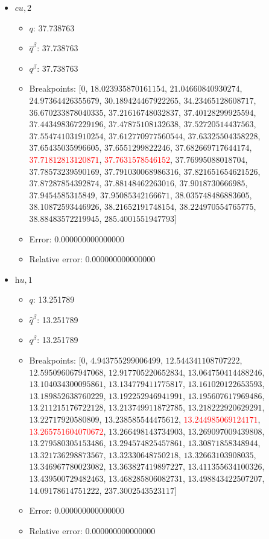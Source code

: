 \documentclass{article}%
\begin{document}
\begin{itemize}
\begin{itemize}
		\item Error: 0.000000000000000%
		\item Relative error: 0.000000000000000%
	\end{itemize}%
	\item $\textit{cu},2$%
	\begin{itemize}%
		\item $q$: 37.738763%
		\item $\hat{q}^\beta$: 37.738763%
		\item $q^\beta$: 37.738763%
		\item Breakpoints: $[$$0$, $18.023935870161154$, $21.04660840930274$, $24.97364426355679$, $30.189424467922265$, $34.23465128608717$, $36.670233878040335$, $37.21616748032837$, $37.40128299925594$, $37.443498367229196$, $37.47875108132638$, $37.52720514437563$, $37.554741031910254$, $37.612770977560544$, $37.63325504358228$, $37.65435035996605$, $37.6551299822246$, $37.682669717644174$, \textcolor{red}{$37.71812813120871$}, \textcolor{red}{$37.7631578546152$}, $37.76995088018704$, $37.78573239590169$, $37.791030068986316$, $37.821651654621526$, $37.87287854392874$, $37.88148462263016$, $37.9018730666985$, $37.9454585315849$, $37.95085342166671$, $38.035748486883605$, $38.10872593446926$, $38.21652191748154$, $38.224970554765775$, $38.88483572219945$, $285.4001551947793$$]$%
		\item Error: 0.000000000000000%
		\item Relative error: 0.000000000000000%
	\end{itemize}%
	\item $\textit{hu},1$%
	\begin{itemize}%
		\item $q$: 13.251789%
		\item $\hat{q}^\beta$: 13.251789%
		\item $q^\beta$: 13.251789%
		\item Breakpoints: $[$$0$, $4.943755299006499$, $12.544341108707222$, $12.595096067947068$, $12.917705220652834$, $13.064750414488246$, $13.104034300095861$, $13.134779411775817$, $13.161020122653593$, $13.189852638760229$, $13.192252946941991$, $13.195607617969486$, $13.211215176722128$, $13.213749911872785$, $13.218222920629291$, $13.22717920580809$, $13.238585544475612$, \textcolor{red}{$13.244985069124171$}, \textcolor{red}{$13.265751604070672$}, $13.266498143734903$, $13.269097009439808$, $13.279580305153486$, $13.294574825457861$, $13.30871858348944$, $13.321736298873567$, $13.32330648750218$, $13.32663103908035$, $13.346967780023082$, $13.363827419897227$, $13.411355634100326$, $13.439500729482463$, $13.468285806082731$, $13.498843422507207$, $14.09178614751222$, $237.3002543523117$$]$%
		\item Error: 0.000000000000000%
		\item Relative error: 0.000000000000000%
	\end{itemize}%
\end{itemize}%
\end{document}

